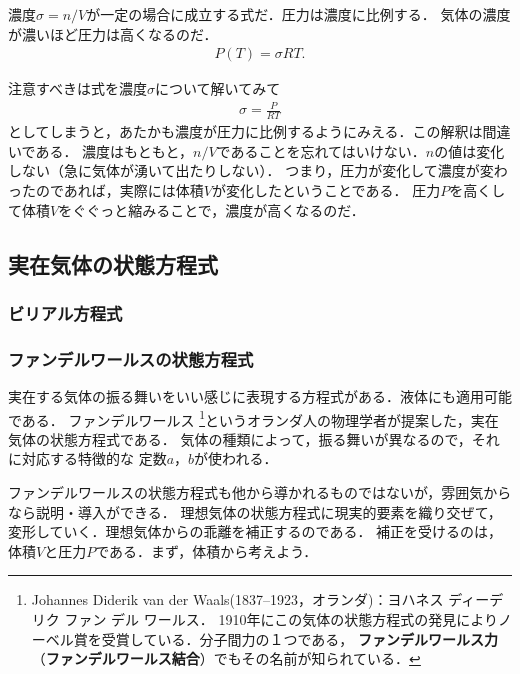         濃度$\sigma = n/V$が一定の場合に成立する式だ．圧力は濃度に比例する．
        気体の濃度が濃いほど圧力は高くなるのだ．
        \begin{align}
            P(T) = \sigma RT.
        \end{align}

        注意すべきは式を濃度$\sigma$について解いてみて
        \begin{align}
            \sigma = \frac{P}{RT}
        \end{align}
        としてしまうと，あたかも濃度が圧力に比例するようにみえる．この解釈は間違いである．
        濃度はもともと，$n/V$であることを忘れてはいけない．$n$の値は変化しない（急に気体が湧いて出たりしない）．
        つまり，圧力が変化して濃度が変わったのであれば，実際には体積$V$が変化したということである．
        圧力$P$を高くして体積$V$をぐぐっと縮みることで，濃度が高くなるのだ．

        \subsection{実在気体の状態方程式}
        \subsubsection{ビリアル方程式}
        \subsubsection{ファンデルワールスの状態方程式}
        実在する気体の振る舞いをいい感じに表現する方程式がある．液体にも適用可能である．
        ファンデルワールス
            \footnote{
                Johannes Diderik van der Waals(1837--1923，オランダ)：ヨハネス ディーデリク ファン デル ワールス．
                1910年にこの気体の状態方程式の発見によりノーベル賞を受賞している．分子間力の１つである，
                \textbf{ファンデルワールス力}（\textbf{ファンデルワールス結合}）でもその名前が知られている．
            }というオランダ人の物理学者が提案した，実在気体の状態方程式である．
        気体の種類によって，振る舞いが異なるので，それに対応する特徴的な 定数$a$，$b$が使われる．

        ファンデルワールスの状態方程式も他から導かれるものではないが，雰囲気からなら説明・導入ができる．
        理想気体の状態方程式に現実的要素を織り交ぜて，変形していく．理想気体からの乖離を補正するのである．
        補正を受けるのは，体積$V$と圧力$P$である．まず，体積から考えよう．

